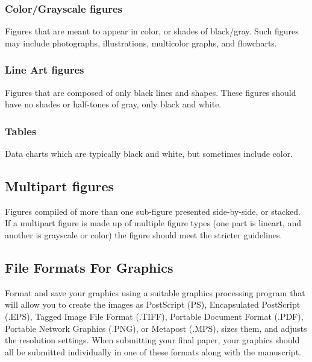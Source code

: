 \documentclass[journal]{IEEEtran}
\begin{document}
\subsubsection{Color/Grayscale figures}
{Figures that are meant to appear in color, or shades of black/gray. Such figures may include photographs, illustrations, multicolor graphs, and flowcharts.}

\subsubsection{Line Art figures}
{Figures that are composed of only black lines and shapes. These figures should have no shades or half-tones of gray, only black and white.}

\subsubsection{Tables}
{Data charts which are typically black and white, but sometimes include color.}



\subsection{Multipart figures}
Figures compiled of more than one sub-figure presented side-by-side, or stacked. If a multipart figure is made up of multiple figure types (one part is lineart, and another is grayscale or color) the figure should meet the stricter guidelines.

\subsection{File Formats For Graphics}\label{formats}
Format and save your graphics using a suitable graphics processing program that will allow you to create the images as PostScript (PS), Encapsulated PostScript (.EPS), Tagged Image File Format (.TIFF), Portable Document Format (.PDF), Portable Network Graphics (.PNG), or Metapost (.MPS), sizes them, and adjusts the resolution settings. When submitting your final paper, your graphics should all be submitted individually in one of these formats along with the manuscript.
\end{document}

